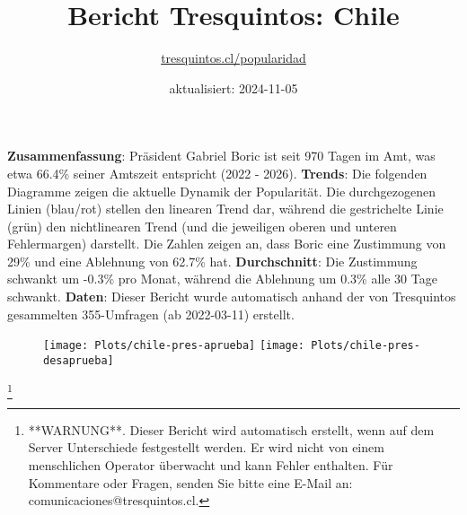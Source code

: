 \documentclass[
]{article}
\title{Bericht Tresquintos: Chile}
\subtitle{\href{https://tresquintos.cl}{tresquintos.cl/popularidad}}
\author{}
\date{\vspace{-2.5em}aktualisiert: 2024-11-05}
\begin{document}
\maketitle

\addtolength{\headheight}{1.0cm} 
\pagestyle{fancy} 
\renewcommand{\headrulewidth}{0pt}

\textbf{Zusammenfassung}: Präsident Gabriel Boric ist seit 970 Tagen im
Amt, was etwa 66.4\% seiner Amtszeit entspricht (2022 - 2026).
\textbf{Trends}: Die folgenden Diagramme zeigen die aktuelle Dynamik der
Popularität. Die durchgezogenen Linien (blau/rot) stellen den linearen
Trend dar, während die gestrichelte Linie (grün) den nichtlinearen Trend
(und die jeweiligen oberen und unteren Fehlermargen) darstellt. Die
Zahlen zeigen an, dass Boric eine Zustimmung von 29\% und eine Ablehnung
von 62.7\% hat. \textbf{Durchschnitt}: Die Zustimmung schwankt um -0.3\%
pro Monat, während die Ablehnung um 0.3\% alle 30 Tage schwankt.
\textbf{Daten}: Dieser Bericht wurde automatisch anhand der von
Tresquintos gesammelten 355-Umfragen (ab 2022-03-11) erstellt.

\begin{figure}

{\centering \texttt{[image: Plots/chile-pres-aprueba]} \texttt{[image: Plots/chile-pres-desaprueba]} 

}

\end{figure}

\let\thefootnote\relax

\footnote{**WARNUNG**. Dieser Bericht wird automatisch erstellt, wenn auf dem Server Unterschiede festgestellt werden. Er wird nicht von einem menschlichen Operator überwacht und kann Fehler enthalten. Für Kommentare oder Fragen, senden Sie bitte eine E-Mail an: comunicaciones@tresquintos.cl.}
\end{document}

